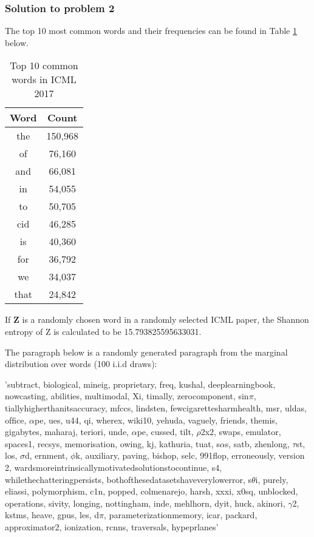 \documentclass[12pt]{article}%
\begin{document}
\subsubsection{Solution to problem 2}
 
The top 10 most common words and their frequencies can be found in Table \ref{table:Q2} below. 

\begin{table}[h]
\centering
\begin{tabular}{|c|c|}
\hline
\textbf{Word} & \textbf{Count} \\ \hline
the           & 150,968         \\ \hline
of            & 76,160          \\ \hline
and           & 66,081          \\ \hline
in            & 54,055          \\ \hline
to            & 50,705          \\ \hline
cid           & 46,285          \\ \hline
is            & 40,360          \\ \hline
for           & 36,792          \\ \hline
we            & 34,037          \\ \hline
that          & 24,842          \\ \hline
\end{tabular}
\caption{Top 10 common words in ICML 2017}
\label{table:Q2}
\end{table}

If \textbf{Z} is a randomly chosen word in a randomly selected ICML paper, the Shannon entropy of Z is calculated to be 15.793825595633031.

The paragraph below is a randomly generated paragraph from the marginal distribution over words (100 i.i.d draws):

\begin{displayquote}
'subtract, biological, mineig, proprietary, freq, kushal, deeplearningbook, nowcasting, abilities, multimodal, Xi, timally, zerocomponent, sin$\pi$, tiallyhigherthanitsaccuracy, mfccs, lindsten, fewcigarettesharmhealth, msr, uldas, ofﬁce, $\alpha$pe, ues, u44, qi, wherex, wiki10, yehuda, vaguely, friends, themis, gigabytes, maharaj, teriori, unde, $\alpha$pe, cussed, tilt, $\rho$2x2, swaps, emulator, spaces1, recsys, memorisation, owing, kj, kathuria, tuat, s$\alpha$s, satb, zhenlong, $\tau$st, los, $\sigma$d, ernment, $\phi$k, auxiliary, paving, bishop, selc, 991flop, erroneously, version 2, wardsmoreintrinsicallymotivatedsolutionstocontinue, s4, whilethechatteringpersists, bothofthesedatasetshaveverylowerror, s$\theta$i, purely, eliassi, polymorphism, c1n, popped, colmenarejo, harsh, xxxi, x0sq, unblocked, operations, sivity, longing, nottingham, inde, mehlhorn, dyit, huck, akinori, $\gamma$2, kstms, heave, gpus, les, d$\pi$, parameterizationmemory, icar, packard, approximator2, ionization, rcnns, traversals, hypeprlanes'
\end{displayquote}
\end{document}
